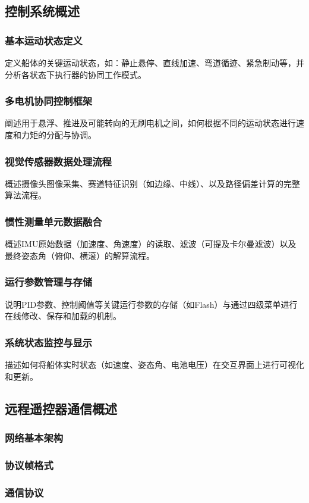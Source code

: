 \subsection{控制系统概述}
\subsubsection{基本运动状态定义}
定义船体的关键运动状态，如：静止悬停、直线加速、弯道循迹、紧急制动等，并分析各状态下执行器的协同工作模式。
\subsubsection{多电机协同控制框架}
阐述用于悬浮、推进及可能转向的无刷电机之间，如何根据不同的运动状态进行速度和力矩的分配与协调。
\subsubsection{视觉传感器数据处理流程}
概述摄像头图像采集、赛道特征识别（如边缘、中线）、以及路径偏差计算的完整算法流程。
\subsubsection{惯性测量单元数据融合}
概述IMU原始数据（加速度、角速度）的读取、滤波（可提及卡尔曼滤波）以及最终姿态角（俯仰、横滚）的解算流程。
\subsubsection{运行参数管理与存储} 
说明PID参数、控制阈值等关键运行参数的存储（如Flash）与通过四级菜单进行在线修改、保存和加载的机制。
\subsubsection{系统状态监控与显示}
描述如何将船体实时状态（如速度、姿态角、电池电压）在交互界面上进行可视化和更新。

\subsection{远程遥控器通信概述}
\subsubsection{网络基本架构}
\subsubsection{协议帧格式}
\subsubsection{通信协议}

